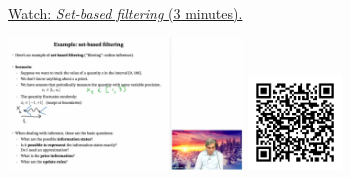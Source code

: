 
\begin{minipage}{10cm}
    \href{https://act4e-spring21.netlify.app/videos/spring2021-tradeoffs:tradeoffs:orders:set-based-filtering.html}{Watch: \emph{Set-based filtering} (3 minutes).}
        
    \href{https://act4e-spring21.netlify.app/videos/spring2021-tradeoffs:tradeoffs:orders:set-based-filtering.html}{\includegraphics[height=3.5cm]{spring2021-tradeoffs:tradeoffs:orders:set-based-filtering/thumbnails.jpg}}
    \href{https://act4e-spring21.netlify.app/videos/spring2021-tradeoffs:tradeoffs:orders:set-based-filtering.html}{\includegraphics[height=2.5cm]{spring2021-tradeoffs:tradeoffs:orders:set-based-filtering/qrcode.png}}
\end{minipage}
